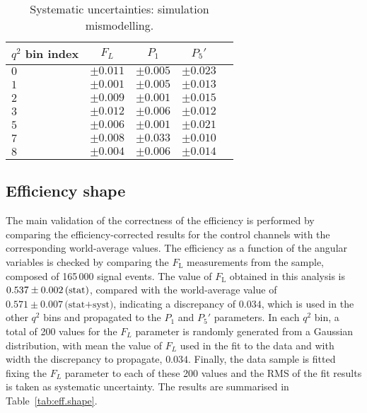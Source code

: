 \begin{table*}[!htb]
  \begin {center}
    \begin{small}
      \caption{Systematic uncertainties: simulation mismodelling.
        \label{tab:mis.modelling}}
      \begin{tabular}{l|c|c|c|c}
        $q^2$ bin index  & $F_L$ & $P_1$ & $P_5'$ \\
        \hline
        $ 0 $ & $\pm0.011$ & $\pm0.005$ & $\pm0.023$\\
        $ 1 $ & $\pm0.001$ & $\pm0.005$ & $\pm0.013$\\
        $ 2 $ & $\pm0.009$ & $\pm0.001$ & $\pm0.015$\\
        $ 3 $ & $\pm0.012$ & $\pm0.006$ & $\pm0.012$\\
        $ 5 $ & $\pm0.006$ & $\pm0.001$ & $\pm0.021$\\
        $ 7 $ & $\pm0.008$ & $\pm0.033$ & $\pm0.010$\\
        $ 8 $ & $\pm0.004$ & $\pm0.006$ & $\pm0.014$\\
      \end{tabular}
    \end{small}
  \end{center}
\end{table*}

\subsection{Efficiency shape}
\label{sec:effshape-syst}

The main validation of the correctness of the efficiency is performed by comparing the efficiency-corrected results for the control channels with the corresponding world-average values.
The efficiency as a function of the angular variables is checked by comparing the $F_\mathrm{L}$ measurements from the \BtoKstJpsi sample, composed of 165\,000 signal events.
The value of $F_\mathrm{L}$ obtained in this analysis is $0.537 \pm 0.002\,\textrm{(stat)}$, compared with the world-average value of $0.571 \pm 0.007\,\text{(stat+syst)}$, indicating a discrepancy of $0.034$, which is used in the other $q^2$ bins and propagated to the $P_1$ and $P_5'$ parameters.
In each $q^2$ bin, a total of 200 values for the $F_L$ parameter is randomly generated from a Gaussian distribution, with mean the value of $F_L$ used in the fit to the data and with width the discrepancy to propagate, $0.034$.
Finally, the data sample is fitted fixing the $F_L$ parameter to each of these 200 values and the RMS of the fit results is taken as systematic uncertainty.
The results are summarised in Table~\ref{tab:eff.shape}.

